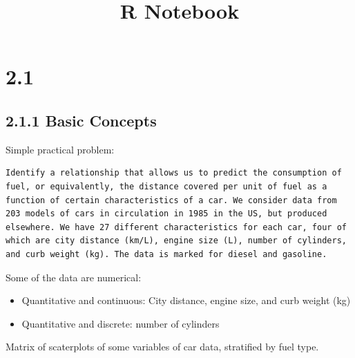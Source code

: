 \documentclass[
]{article}
\title{R Notebook}
\author{}
\date{\vspace{-2.5em}}
\providecommand{\tightlist}{%
  \setlength{\itemsep}{0pt}\setlength{\parskip}{0pt}}
\begin{document}
\maketitle

\hypertarget{section}{%
\section{2.1}\label{section}}

\hypertarget{basic-concepts}{%
\subsection{2.1.1 Basic Concepts}\label{basic-concepts}}

Simple practical problem:

\begin{verbatim}
Identify a relationship that allows us to predict the consumption of fuel, or equivalently, the distance covered per unit of fuel as a function of certain characteristics of a car. We consider data from 203 models of cars in circulation in 1985 in the US, but produced elsewhere. We have 27 different characteristics for each car, four of which are city distance (km/L), engine size (L), number of cylinders, and curb weight (kg). The data is marked for diesel and gasoline.
\end{verbatim}

Some of the data are numerical:

\begin{itemize}
\tightlist
\item
  Quantitative and continuous: City distance, engine size, and curb
  weight (kg)
\item
  Quantitative and discrete: number of cylinders
\end{itemize}

Matrix of scaterplots of some variables of car data, stratified by fuel
type.
\end{document}
